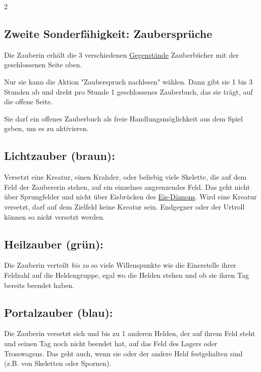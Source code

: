 \documentclass[10pt, a4paper, oneside]{book}
\newcommand{\fan}[1]{\textit{#1}}
\begin{document}
\begin{multicols*}{2}
\begin{bgcolor}
\subsection{Zweite Sonderfähigkeit: Zaubersprüche}

Die Zauberin erhält die 3 verschiedenen \hyperref[gegenstaende-und-sonderplaettchen]{Gegenstände} Zauberbücher mit der geschlossenen Seite oben.

Nur sie kann die Aktion "Zauberspruch nachlesen" wählen. Dann gibt sie 1 bis 3 Stunden ab und dreht pro Stunde 1 geschlossenes Zauberbuch, das sie trägt, auf die offene Seite. 

Sie darf ein offenes Zauberbuch als freie Handlungsmöglichkeit aus dem Spiel geben, um es zu aktivieren.
\supercite{dlh-begleitheft,dlh11-heldenkarte-zauberer}





\subsection{Lichtzauber (braun):} 

Versetzt eine Kreatur, einen Krahder, oder beliebig viele Skelette, die auf dem Feld der Zaubererin stehen, auf ein einzelnes angrenzendes Feld. Das geht nicht über Sprungfelder und nicht über Eisbrücken des \hyperref[eis-daemon]{Eis-Dämons}. Wird eine Kreatur versetzt, darf auf dem Zielfeld keine Kreatur sein.
\supercite{dlh11-heldenkarte-zauberer}
Endgegner oder der Urtroll\supercite{dlh-faq} können so nicht versetzt werden.



\subsection{Heilzauber (grün):} 

Die Zauberin verteilt \fan{bis zu} so viele Willenspunkte wie die Einerstelle ihrer Feldzahl auf die Heldengruppe, egal wo die Helden stehen und ob sie ihren Tag bereits beendet haben.


\columnbreak


\subsection{Portalzauber (blau):} 

Die Zauberin versetzt sich und bis zu 1 anderen Helden, der auf ihrem Feld steht und seinen Tag noch nicht beendet hat, auf das Feld des Lagers oder Trosswagens. Das geht auch, wenn sie oder der andere Held festgehalten sind (z.B. von Skeletten oder Spornen).
\supercite{dlh-begleitheft,40664}



\end{bgcolor}
\end{multicols*}
\end{document}
